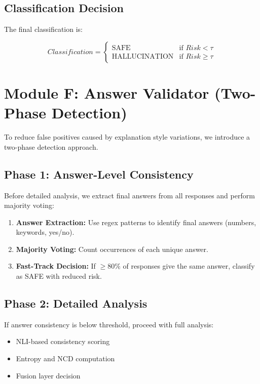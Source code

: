 \subsection{Classification Decision}

The final classification is:

\begin{equation}
    Classification = \begin{cases}
        \text{SAFE} & \text{if } Risk < \tau \\
        \text{HALLUCINATION} & \text{if } Risk \geq \tau
    \end{cases}
\end{equation}

\section{Module F: Answer Validator (Two-Phase Detection)}

To reduce false positives caused by explanation style variations, we introduce a two-phase detection approach.

\subsection{Phase 1: Answer-Level Consistency}

Before detailed analysis, we extract final answers from all responses and perform majority voting:

\begin{enumerate}
    \item \textbf{Answer Extraction:} Use regex patterns to identify final answers (numbers, keywords, yes/no).
    \item \textbf{Majority Voting:} Count occurrences of each unique answer.
    \item \textbf{Fast-Track Decision:} If $\geq 80\%$ of responses give the same answer, classify as SAFE with reduced risk.
\end{enumerate}

\subsection{Phase 2: Detailed Analysis}

If answer consistency is below threshold, proceed with full analysis:

\begin{itemize}
    \item NLI-based consistency scoring
    \item Entropy and NCD computation
    \item Fusion layer decision
\end{itemize}

